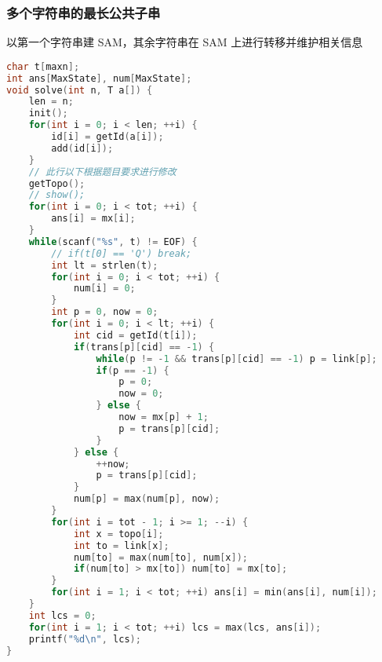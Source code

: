 \subsubsection{多个字符串的最长公共子串}

以第一个字符串建 SAM，其余字符串在 SAM 上进行转移并维护相关信息

\begin{lstlisting}[language=C++]
char t[maxn];
int ans[MaxState], num[MaxState];
void solve(int n, T a[]) {
    len = n;
    init();
    for(int i = 0; i < len; ++i) {
        id[i] = getId(a[i]);
        add(id[i]);
    }
    // 此行以下根据题目要求进行修改
    getTopo();
    // show();
    for(int i = 0; i < tot; ++i) {
        ans[i] = mx[i];
    }
    while(scanf("%s", t) != EOF) {
        // if(t[0] == 'Q') break;
        int lt = strlen(t);
        for(int i = 0; i < tot; ++i) {
            num[i] = 0;
        }
        int p = 0, now = 0;
        for(int i = 0; i < lt; ++i) {
            int cid = getId(t[i]);
            if(trans[p][cid] == -1) {
                while(p != -1 && trans[p][cid] == -1) p = link[p];
                if(p == -1) {
                    p = 0;
                    now = 0;
                } else {
                    now = mx[p] + 1;
                    p = trans[p][cid];
                }
            } else {
                ++now;
                p = trans[p][cid];
            }
            num[p] = max(num[p], now);
        }
        for(int i = tot - 1; i >= 1; --i) {
            int x = topo[i];
            int to = link[x];
            num[to] = max(num[to], num[x]);
            if(num[to] > mx[to]) num[to] = mx[to];
        }
        for(int i = 1; i < tot; ++i) ans[i] = min(ans[i], num[i]);
    }
    int lcs = 0;
    for(int i = 1; i < tot; ++i) lcs = max(lcs, ans[i]);
    printf("%d\n", lcs);
}    
\end{lstlisting}